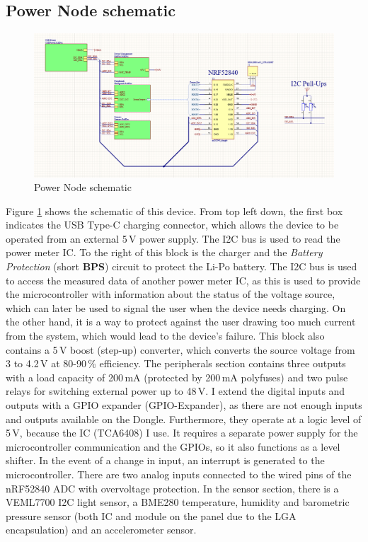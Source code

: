 \subsection{Power Node schematic}
\begin{figure}[!htb]
    \centering
    \includegraphics[width=\textwidth]{img/powernode.png}
    \caption{Power Node schematic}
    \label{fig:powernodeschematics}
\end{figure}
\noindent
Figure \ref{fig:powernodeschematics} shows the schematic of this device. From top left down, the first box indicates the USB Type-C charging connector, which allows the device to be operated from an external 5\,\si{\volt} power supply. The I2C bus is used to read the power meter IC. To the right of this block is the charger and the \textit{Battery Protection} (short \textbf{BPS}) circuit to protect the Li-Po battery. The I2C bus is used to access the measured data of another power meter IC, as this is used to provide the microcontroller with information about the status of the voltage source, which can later be used to signal the user when the device needs charging. On the other hand, it is a way to protect against the user drawing too much current from the system, which would lead to the device's failure. This block also contains a 5\,\si{\volt} boost (step-up) converter, which converts the source voltage from 3 to 4.2\,\si{\volt} at 80-90\,\% efficiency. The peripherals section contains three outputs with a load capacity of 200\,\si{\milli\ampere} (protected by 200\,\si{\milli\ampere} polyfuses) and two pulse relays for switching external power up to 48\,\si{\volt}. I extend the digital inputs and outputs with a GPIO expander (GPIO-Expander), as there are not enough inputs and outputs available on the Dongle. Furthermore, they operate at a logic level of 5\,\si{\volt}, because the IC (TCA6408) I use. It requires a separate power supply for the microcontroller communication and the GPIOs, so it also functions as a level shifter. In the event of a change in input, an interrupt is generated to the microcontroller. There are two analog inputs connected to the wired pins of the nRF52840 ADC with overvoltage protection. In the sensor section, there is a VEML7700 I2C light sensor, a BME280 temperature, humidity and barometric pressure sensor (both IC and module on the panel due to the LGA encapsulation) and an accelerometer sensor.

